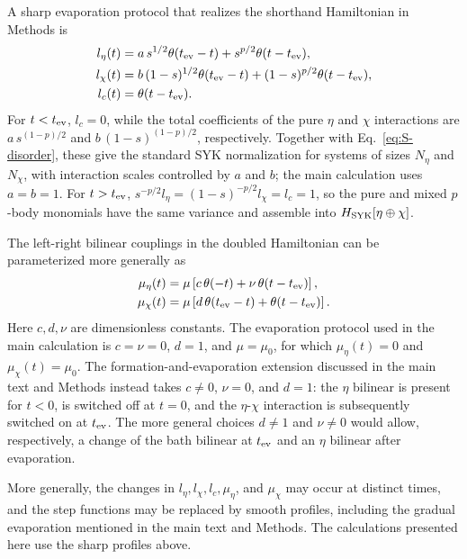 \documentclass[11pt,a4paper]{article}
\begin{document}
A sharp evaporation protocol that realizes the shorthand Hamiltonian in
Methods is
\begin{equation}
\begin{aligned}
l_\eta(t)
&=
a\,s^{1/2}\theta(t_{\rm ev}-t)
+s^{p/2}\theta(t-t_{\rm ev}),
\\
l_\chi(t)
&=
b\,(1-s)^{1/2}\theta(t_{\rm ev}-t)
+(1-s)^{p/2}\theta(t-t_{\rm ev}),
\\
l_c(t)
&=
\theta(t-t_{\rm ev}) .
\end{aligned}
\label{eq:S-l-protocol}
\end{equation}
For \(t<t_{\rm ev}\), \(l_c=0\), while the total coefficients of the pure
\(\eta\) and \(\chi\) interactions are
\(a\,s^{(1-p)/2}\) and \(b\,(1-s)^{(1-p)/2}\), respectively. Together with
Eq.~\eqref{eq:S-disorder}, these give the standard SYK normalization for
systems of sizes \(N_\eta\) and \(N_\chi\), with interaction scales controlled
by \(a\) and \(b\); the main calculation uses \(a=b=1\). For
\(t>t_{\rm ev}\),
\(s^{-p/2}l_\eta=(1-s)^{-p/2}l_\chi=l_c=1\), so the pure and mixed
\(p\)-body monomials have the same variance and assemble into
\(H_{\rm SYK}[\eta\oplus\chi]\).

The left-right bilinear couplings in the doubled Hamiltonian can be
parameterized more generally as
\begin{equation}
\begin{aligned}
\mu_\eta(t)
&=
\mu\left[
c\,\theta(-t)+\nu\,\theta(t-t_{\rm ev})
\right],
\\
\mu_\chi(t)
&=
\mu\left[
d\,\theta(t_{\rm ev}-t)+\theta(t-t_{\rm ev})
\right].
\end{aligned}
\label{eq:S-bilinear-protocol}
\end{equation}
Here \(c,d,\nu\) are dimensionless constants. The evaporation protocol used
in the main calculation is \(c=\nu=0\), \(d=1\), and \(\mu=\mu_0\), for which
\(\mu_\eta(t)=0\) and \(\mu_\chi(t)=\mu_0\). The
formation-and-evaporation extension discussed in the main text and Methods instead takes
\(c\neq0\), \(\nu=0\), and \(d=1\): the \(\eta\) bilinear is present for
\(t<0\), is switched off at \(t=0\), and the \(\eta\)-\(\chi\) interaction is
subsequently switched on at \(t_{\rm ev}\). The more general choices
\(d\neq1\) and \(\nu\neq0\) would allow, respectively, a change of the bath
bilinear at \(t_{\rm ev}\) and an \(\eta\) bilinear after evaporation.

More generally, the changes in \(l_\eta,l_\chi,l_c,\mu_\eta\), and
\(\mu_\chi\) may occur at distinct times, and the step functions may be
replaced by smooth profiles, including the gradual evaporation mentioned in
the main text and Methods. The calculations presented here use the sharp
profiles above.
\end{document}
